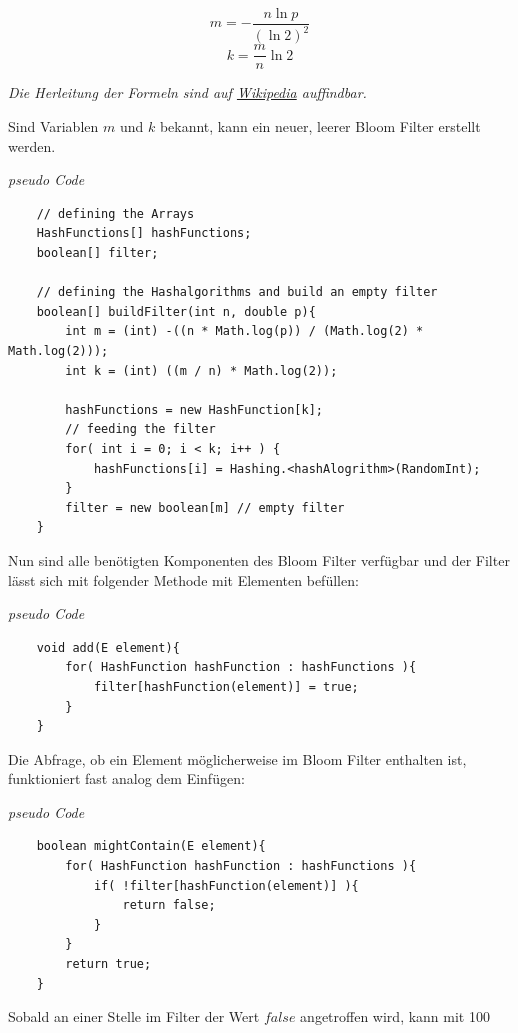 \documentclass{article}
\begin{document}
    \begin{equation}
        m = -\frac{n \ln{p}}{(\ln{2})^2}
    \end{equation}
    \begin{equation}
        k = \frac{m}{n} \ln{2}
    \end{equation}
    \begin{center}
        \textit{Die Herleitung der Formeln sind auf \href{https://en.wikipedia.org/wiki/Bloom_filter\#Optimal_number_of_hash_functions}{Wikipedia} auffindbar.}
    \end{center}
    Sind Variablen $m$ und $k$ bekannt, kann ein neuer, leerer Bloom Filter erstellt werden.
    \begin{center}
        \textit{pseudo Code}
    \end{center}
    \begin{lstlisting}
    // defining the Arrays
    HashFunctions[] hashFunctions;
    boolean[] filter;

    // defining the Hashalgorithms and build an empty filter
    boolean[] buildFilter(int n, double p){
        int m = (int) -((n * Math.log(p)) / (Math.log(2) * Math.log(2)));
        int k = (int) ((m / n) * Math.log(2));

        hashFunctions = new HashFunction[k];
        // feeding the filter
        for( int i = 0; i < k; i++ ) {
            hashFunctions[i] = Hashing.<hashAlogrithm>(RandomInt);
        }
        filter = new boolean[m] // empty filter
    }
    \end{lstlisting}
    Nun sind alle benötigten Komponenten des Bloom Filter verfügbar und der Filter lässt sich mit folgender Methode mit Elementen befüllen:
    \begin{center}
        \textit{pseudo Code}
    \end{center}
    \begin{lstlisting}
    void add(E element){
        for( HashFunction hashFunction : hashFunctions ){
            filter[hashFunction(element)] = true;
        }
    }
    \end{lstlisting}
    Die Abfrage, ob ein Element möglicherweise im Bloom Filter enthalten ist, funktioniert fast analog dem Einfügen:
    \begin{center}
        \textit{pseudo Code}
    \end{center}
    \begin{lstlisting}
    boolean mightContain(E element){
        for( HashFunction hashFunction : hashFunctions ){
            if( !filter[hashFunction(element)] ){
                return false;
            }
        }
        return true;
    }
    \end{lstlisting}
    Sobald an einer Stelle im Filter der Wert $false$ angetroffen wird, kann mit 100%
\end{document}
